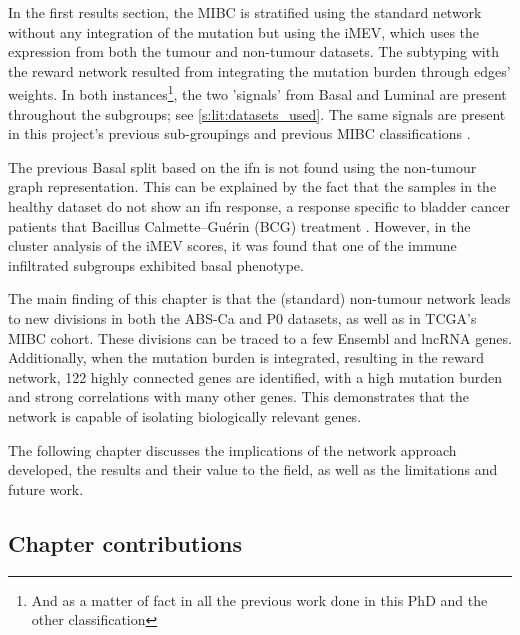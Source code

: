 In the first results section, the MIBC is stratified using the standard network without any integration of the mutation but using the iMEV, which uses the expression from both the tumour and non-tumour datasets. The subtyping with the reward network resulted from integrating the mutation burden through edges' weights. In both instances\footnote{And as a matter of fact in all the previous work done in this PhD and the other classification}, the two 'signals' from Basal and Luminal are present throughout the subgroups; see \cref{s:lit:datasets_used}. The same signals are present in this project's previous sub-groupings and previous MIBC classifications \citep{Robertson2017-mg,Kamoun2020-tj,Marzouka2018-ge}.

The previous Basal split based on the \acrlong{ifn} is not found using the non-tumour graph representation. This can be explained by the fact that the samples in the healthy dataset do not show an \acrshort{ifn} response, a response specific to bladder cancer patients that Bacillus Calmette–Guérin (BCG) treatment \citep{Baker2022-bj}. However,  in the cluster analysis of the iMEV scores, it was found that one of the immune infiltrated subgroups exhibited basal phenotype.

The main finding of this chapter is that the (standard) non-tumour network leads to new divisions in both the ABS-Ca and P0 datasets, as well as in TCGA's MIBC cohort. These divisions can be traced to a few Ensembl  and lncRNA genes. Additionally, when the mutation burden is integrated, resulting in the reward network, 122 highly connected genes are identified, with a high mutation burden and strong correlations with many other genes. This demonstrates that the network is capable of isolating biologically relevant genes.

The following chapter discusses the implications of the network approach developed, the results and their value to the field, as well as the limitations and future work.

\subsection{Chapter contributions}

